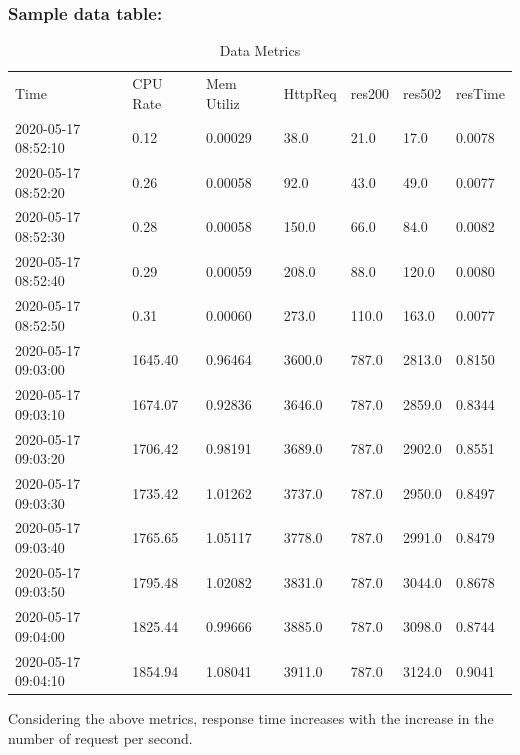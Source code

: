 \subsubsection{Sample data table:}
\begin{table}[htpb]
  \caption[Data table]{Data Metrics}\label{tab:sample}
    \begin{tabular}{lllllll}
    Time               & CPU Rate              & Mem Utiliz    & HttpReq & res200 & res502 & resTime              \\
    2020-05-17 08:52:10 & 0.12                & 0.00029 & 38.0      & 21.0        & 17.0        & 0.0078         \\
    2020-05-17 08:52:20 & 0.26                & 0.00058 & 92.0     & 43.0        & 49.0        & 0.0077 \\
    2020-05-17 08:52:30 & 0.28                & 0.00058 & 150.0     & 66.0        & 84.0        & 0.0082 \\
    2020-05-17 08:52:40 & 0.29 & 0.00059 & 208.0     & 88.0        & 120.0       & 0.0080 \\
    2020-05-17 08:52:50 & 0.31                & 0.00060 & 273.0     & 110.0       & 163.0       & 0.0077 \\
    2020-05-17 09:03:00 & 1645.40  & 0.96464    & 3600.0     & 787.0       & 2813.0      & 0.8150   \\
    2020-05-17 09:03:10 & 1674.07  & 0.92836    & 3646.0     & 787.0       & 2859.0      & 0.8344   \\
    2020-05-17 09:03:20 & 1706.42  & 0.98191    & 3689.0     & 787.0       & 2902.0      & 0.8551   \\
    2020-05-17 09:03:30 & 1735.42             & 1.01262     & 3737.0     & 787.0       & 2950.0      & 0.8497         \\
    2020-05-17 09:03:40 & 1765.65  & 1.05117     & 3778.0     & 787.0       & 2991.0      & 0.8479   \\
    2020-05-17 09:03:50 & 1795.48             & 1.02082    & 3831.0     & 787.0       & 3044.0      & 0.8678   \\
    2020-05-17 09:04:00 & 1825.44             & 0.99666    & 3885.0     & 787.0       & 3098.0      & 0.8744   \\
    2020-05-17 09:04:10 & 1854.94  & 1.08041    & 3911.0     & 787.0       & 3124.0      & 0.9041  
    \end{tabular}
\end{table}

Considering the above metrics, response time increases with the increase in the number of request per second.

